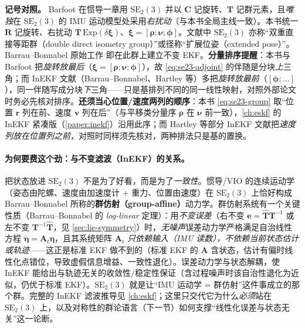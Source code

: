 \begin{note}
\textbf{记号对照。}\;
Barfoot\cite{barfoot2024state} 在惯导一章用 $\mathrm{SE}_2(3)$ 并以 $\mathbf{C}$ 记旋转、$\mathbf{T}$ 记群元素，且\emph{唯独}在 $\mathrm{SE}_2(3)$ 的 IMU 运动模型处采用\emph{右扰动}（与本书全局主线一致）。本书统一 $\mathbf{R}$ 记旋转、右扰动 $\mathbf{T}\,\mathrm{Exp}(\delta\boldsymbol{\xi})$、$\boldsymbol{\xi}=[\boldsymbol{\rho};\boldsymbol{\nu};\boldsymbol{\phi}]$。文献中 $\mathrm{SE}_2(3)$ 亦称“双重直接等距群（double direct isometry group）”或径称“扩展位姿（extended pose）”。Barrau--Bonnabel 原始工作\cite{barrau2017invariant} 即在此群上建立不变 EKF。\textbf{分量排序提醒}：本书与 Barfoot 把\emph{旋转放最后}（$\boldsymbol{\xi}=[\boldsymbol{\rho};\boldsymbol{\nu};\boldsymbol{\phi}]$），故 \cref{eq:se23-adjoint} 的伴随是分块\emph{上}三角；而 InEKF 文献（Barrau--Bonnabel、Hartley 等\cite{hartley2020contact}）多把\emph{旋转放最前}（$[\boldsymbol{\phi};\dots]$），同一伴随写成分块\emph{下}三角——只是基排列不同的同一线性映射，对照外部论文时务必先核对排序。\textbf{还须当心位置/速度两列的顺序}：本书 \cref{eq:se23-group} 取“位置 $\mathbf{r}$ 列在前、速度 $\mathbf{v}$ 列在后”（与平移类分量序 $\boldsymbol{\rho}$ 在 $\boldsymbol{\nu}$ 前一致），\cref{ch:eskf} 的 InEKF 紧凑版（\cref{paper:inekf}）沿用此序；而 Hartley 等部分 InEKF 文献把\emph{速度列放在位置列之前}，对照时同样须先核对，两种排法只是基的置换。
\end{note}

\paragraph{为何要费这个劲：与不变滤波（InEKF）的关系。}
把状态放进 $\mathrm{SE}_2(3)$ 不是为了好看，而是为了\emph{一致性}。惯导/VIO 的连续运动学（姿态由陀螺、速度由加速度计 + 重力、位置由速度）在 $\mathrm{SE}_2(3)$ 上恰好构成 Barrau--Bonnabel 所称的\textbf{群仿射（group-affine）}动力学。群仿射系统有一个关键性质（Barrau--Bonnabel 的 \emph{log-linear} 定理\cite{barrau2017invariant}）：用\emph{不变误差}（右不变 $\mathbf{e}=\hat{\mathbf{T}}\mathbf{T}^{-1}$ 或左不变 $\mathbf{T}^{-1}\hat{\mathbf{T}}$，见 \cref{sec:lie-symmetry}）时，\emph{无噪声}误差动力学严格满足自治线性方程 $\dot{\boldsymbol{\eta}}=\mathbf{A}_t\boldsymbol{\eta}$，且其系统矩阵 $\mathbf{A}_t$ \emph{只依赖输入（IMU 读数），不依赖当前状态估计或轨迹}——这正是标准 EKF 做不到的（标准 EKF 的 $\mathbf{A}$ 含状态，估计有偏时线性化点错位，导致虚假信息增益、一致性退化）。误差动力学与状态解耦，使 InEKF 能给出与轨迹无关的收敛性/稳定性保证（含过程噪声时该自治性退化为近似，仍优于标准 EKF）。$\mathrm{SE}_2(3)$ 就是让“IMU 运动学 = 群仿射”这件事成立的那个群。完整的 InEKF 滤波推导见 \cref{ch:eskf}；这里只交代它为什么\emph{必须}站在 $\mathrm{SE}_2(3)$ 上，以及对称性的群论语言（下一节）如何支撑“线性化误差与状态无关”这一论断。

